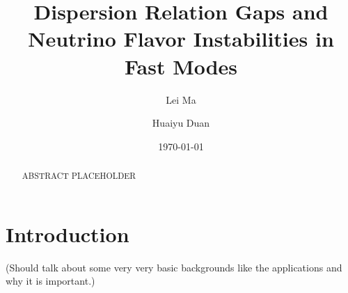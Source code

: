 \documentclass[%
preprint,
 amsmath,amssymb,
 aps,
 prd
]{revtex4-1}
\begin{document}

\title{Dispersion Relation Gaps and Neutrino Flavor Instabilities in Fast Modes}%

\author{Lei Ma}
\author{Huaiyu Duan}%
%


\date{\today}%

\begin{abstract}

ABSTRACT PLACEHOLDER


\end{abstract}

\maketitle




\section{\label{sec-introduction}Introduction}

(Should talk about some very very basic backgrounds like the applications and why it is important.)
\end{document}

